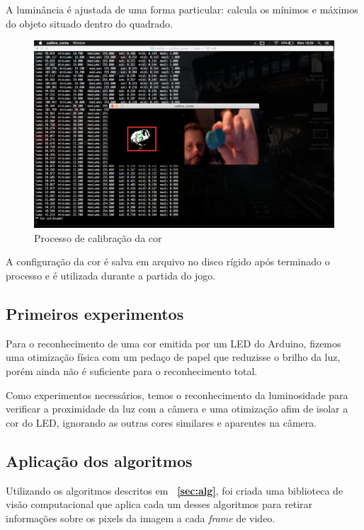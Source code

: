 \documentclass[12pt]{article}
\begin{document}
A lumin\^ancia \'e ajustada de uma forma particular: calcula os m\'inimos e m\'aximos do objeto situado dentro do quadrado.

	\begin{figure}[ht!]
		\begin{center}
			\includegraphics[scale=0.3]{img/calibracor.png}
			\footnotesize \caption{Processo de calibra\c c\~ao da cor }
		\end{center}
	\end{figure}	

A configura\c c\~ao da cor \'e salva em arquivo no disco r\'igido ap\'os terminado o processo e \'e utilizada durante a partida do jogo.

\subsection{Primeiros experimentos}
Para o reconhecimento de uma cor emitida por um LED do Arduino, fizemos uma otimiza\c c\~ao f\'isica
com um peda\c co de papel que reduzisse o brilho da luz, por\'em ainda n\~ao \'e suficiente para
o reconhecimento total.

Como experimentos necess\'arios, temos o reconhecimento da luminosidade para verificar
a proximidade da luz com a c\^amera e uma otimiza\c c\~ao afim de isolar a cor do LED,
ignorando as outras cores similares e aparentes na c\^amera.

\subsection{Aplica\c c\~ao dos algoritmos}
Utilizando os algoritmos descritos em \textbf{~\ref{sec:alg}}, foi criada uma biblioteca de vis\~ao computacional que aplica cada um desses
algoritmos para retirar informa\c c\~oes sobre os pixels da imagem a cada \emph{frame} de video.
\end{document}
